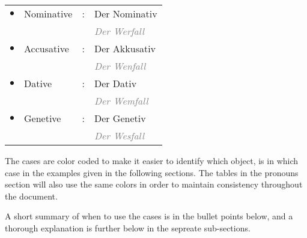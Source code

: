 \documentclass[a4paper,twocolumn,10pt]{article}
\newcommand{\newpar}
{\par \vspace{0.3cm}}
\newcommand{\bulletpoint}
{ $\bullet$  }
\begin{document}
\vspace{0.2cm}

\begin{tabularx}{0.95\linewidth}{lllX}

\rowcolor{white} \bulletpoint & \cellcolor{cell-lightred} Nominative    & : & Der Nominativ\\
\rowcolor{white}              &                                         &   & \textcolor{gray}{ \textit{Der Werfall} }\\
\rowcolor{white} \bulletpoint & \cellcolor{cell-lightyellow} Accusative & : & Der Akkusativ\\
\rowcolor{white}              &                                         &   & \textcolor{gray}{ \textit{Der Wenfall} }\\
\rowcolor{white} \bulletpoint & \cellcolor{cell-lightgreen} Dative      & : & Der Dativ\\
\rowcolor{white}              &                                         &   & \textcolor{gray}{ \textit{Der Wemfall} }\\
\rowcolor{white} \bulletpoint & \cellcolor{cell-lightblue} Genetive     & : & Der Genetiv\\
\rowcolor{white}              &                                         &   & \textcolor{gray}{ \textit{Der Wesfall} }\\

\end{tabularx}

\linenumbers

\vspace{0.2cm}

The cases are color coded to make it easier to identify which object, is in
which case in the examples given in the following sections. The tables in the
pronouns section will also use the same colors in order to maintain consistency
throughout the document.\newpar

A short summary of when to use the cases is in the bullet points below, and a
thorough explanation is further below in the sepreate sub-sections.


\nolinenumbers

\vspace{0.2cm}
\end{document}
